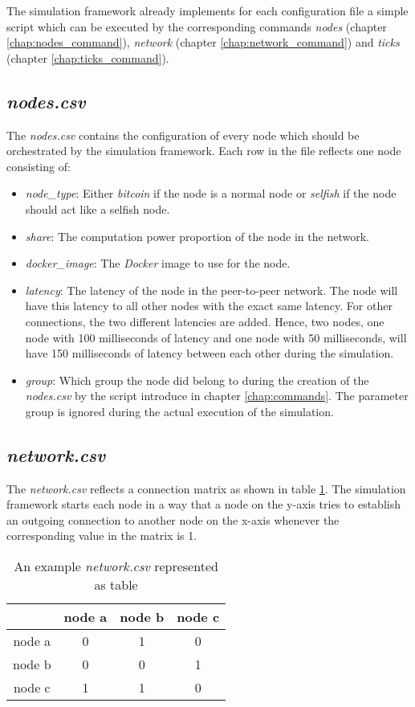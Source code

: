 The simulation framework already implements for each configuration file a simple script which can be executed by the corresponding commands \textit{nodes} (chapter \ref{chap:nodes_command}), \textit{network} (chapter \ref{chap:network_command}) and \textit{ticks} (chapter \ref{chap:ticks_command}).

\subsection{\textit{nodes.csv}}

The \textit{nodes.csv} contains the configuration of every node which should be orchestrated by the simulation framework.
Each row in the file reflects one node consisting of:
\begin{itemize}
	\item \textit{node\_type}: Either \textit{bitcoin} if the node is a normal node or \textit{selfish} if the node should act like a selfish node.
	\item \textit{share}: The computation power proportion of the node in the network.
	\item \textit{docker\_image}: The \textit{Docker} image to use for the node.
	\item \textit{latency}: The latency  of the node in the peer-to-peer network.
	The node will have this latency to all other nodes with the exact same latency.
	For other connections, the two different latencies are added.
	Hence, two nodes, one node with 100 milliseconds of latency and one node with 50 milliseconds, will have 150 milliseconds of latency between each other during the simulation.
	\item \textit{group}: Which group the node did belong to during the creation of the \textit{nodes.csv} by the script introduce in chapter \ref{chap:commands}.
	The parameter group is ignored during the actual execution of the simulation.
\end{itemize}
 
\subsection{\textit{network.csv}}
The \textit{network.csv} reflects a connection matrix as shown in table \ref{tab:network_csv}.
The simulation framework starts each node in a way that a node on the y-axis tries to establish an outgoing connection to another node on the x-axis whenever the corresponding value in the matrix is 1.

\begin{table}
  \centering
  \begin{tabular}{c|ccc}
    			& node a 	& node b	& node c	\\
    \hline
    node a		& 0			& 1         & 0         \\
    node b      & 0         & 0         & 1			\\
    node c      & 1         & 1			& 0         \\
  \end{tabular}
  \caption{An example \textit{network.csv} represented as table}
  \label{tab:network_csv}
\end{table}

